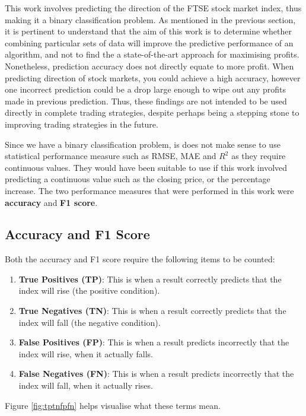 \documentclass{UoYCSproject}
\begin{document}
This work involves predicting the direction of the FTSE stock market index, thus making it a binary classification problem. As mentioned in the previous section, it is pertinent to understand that the aim of this work is to determine whether combining particular sets of data will improve the predictive performance of an algorithm, and not to find the a state-of-the-art approach for maximising profits. Nonetheless, prediction accuracy does not directly equate to more profit. When predicting direction of stock markets, you could achieve a high accuracy, however one incorrect prediction could be a drop large enough to wipe out any profits made in previous prediction. Thus, these findings are not intended to be used directly in complete trading strategies, despite perhaps being a stepping stone to improving trading strategies in the future. 

Since we have a binary classification problem, is does not make sense to use statistical performance measure such as RMSE, MAE and $R^2$ as they require continuous values. They would have been suitable to use if this work involved predicting a continuous value such as the closing price, or the percentage increase. The two performance measures that were performed in this work were \textbf{accuracy} and \textbf{F1 score}. 

\subsection{Accuracy and F1 Score}

Both the accuracy and F1 score require the following items to be counted:

\begin{enumerate}
    \item \textbf{True Positives (TP)}: This is when a result correctly predicts that the index will rise (the positive condition).
    \item \textbf{True Negatives (TN)}: This is when a result correctly predicts that the index will fall (the negative condition).
    \item \textbf{False Positives (FP)}: This is when a result predicts incorrectly that the index will rise, when it actually falls.
    \item \textbf{False Negatives (FN)}: This is when a result predicts incorrectly that the index will fall, when it actually rises.
\end{enumerate}

Figure \ref{fig:tptnfpfn} helps visualise what these terms mean.
\end{document}
